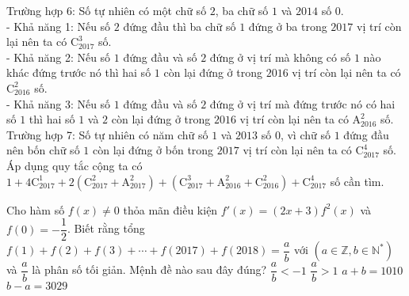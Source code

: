 \begin{ex}
{		Trường hợp 6: Số tự nhiên có một chữ số $2$, ba chữ số $1$ và $2014$ số $0$. \\
		- Khả năng 1: Nếu số $2$ đứng đầu thì ba chữ số $1$ đứng ở ba trong $2017$ vị trí còn lại nên ta có $\mathrm{C}_{2017}^3$ số. \\
		- Khả năng 2: Nếu số $1$ đứng đầu và số $2$ đứng ở vị trí mà không có số $1$ nào khác đứng trước nó thì hai số $1$ còn lại đứng ở trong $2016$ vị trí còn lại nên ta có $\mathrm{C}_{2016}^2$ số. \\
		- Khả năng 3: Nếu số $1$ đứng đầu và số $2$ đứng ở vị trí mà đứng trước nó có hai số $1$ thì hai số $1$ và $2$ còn lại đứng ở trong $2016$ vị trí còn lại nên ta có $\mathrm{A}_{2016}^2$ số. \\
		Trường hợp 7: Số tự nhiên có năm chữ số $1$ và $2013$ số $0$, vì chữ số $1$ đứng đầu nên bốn chữ số $1$ còn lại đứng ở bốn trong $2017$ vị trí còn lại nên ta có $\mathrm{C}_{2017}^4$ số. \\
		Áp dụng quy tắc cộng ta có $1+4\mathrm{C}_{2017}^1+2\left(\mathrm{C}_{2017}^2+\mathrm{A}_{2017}^2\right)+\left(\mathrm{C}_{2017}^3+\mathrm{A}_{2016}^2+\mathrm{C}_{2016}^2\right)+\mathrm{C}_{2017}^4$ số cần tìm.}
\end{ex}

\begin{ex}%
	Cho hàm số $f(x)\ne 0$ thỏa mãn điều kiện $f'(x)=(2x+3)f^2(x)$ và $f(0)=-\dfrac{1}{2}$. Biết rằng tổng $f(1)+f(2)+f(3)+\cdots +f(2017)+f(2018)=\dfrac{a}{b}$ với $\left(a\in \mathbb{Z},b\in {\mathbb{N}}^{*}\right)$ và $\dfrac{a}{b}$ là phân số tối giản. Mệnh đề nào sau đây đúng?
	\choice
	{$\dfrac{a}{b}<-1$}
	{$\dfrac{a}{b}>1$}
	{$a+b=1010$}
	{\True $b-a=3029$}
\end{ex}


